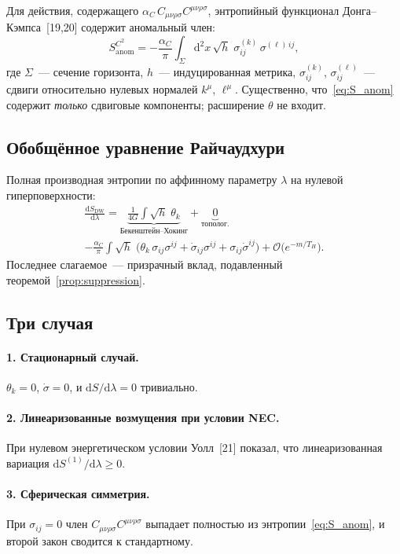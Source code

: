 \documentclass[12pt,a4paper]{article}
\newcommand{\dd}{\mathrm{d}}
\newcommand{\order}{\mathcal{O}}
\newcommand{\Thr}{T_{\!H}}
\newcommand{\Weylsq}{C_{\mu\nu\rho\sigma}C^{\mu\nu\rho\sigma}}
\theoremstyle{plain}
\theoremstyle{definition}
\begin{document}
Для действия, содержащего $\alpha_C\,\Weylsq$, энтропийный функционал
Донга--Кэмпса~[19,20] содержит аномальный член:
\begin{equation}\label{eq:S_anom}
  S_{\mathrm{anom}}^{C^2} = -\frac{\alpha_C}{\pi}
  \int_\Sigma\!\dd^2x\,\sqrt{h}\;
  \sigma^{(k)}_{ij}\,\sigma^{(\ell)\,ij},
\end{equation}
где $\Sigma$~--- сечение горизонта, $h$~--- индуцированная метрика,
$\sigma^{(k)}_{ij}$, $\sigma^{(\ell)}_{ij}$~--- сдвиги
относительно нулевых нормалей $k^\mu$, $\ell^\mu$. Существенно,
что~\eqref{eq:S_anom} содержит \emph{только} сдвиговые компоненты;
расширение $\theta$ не входит.

\subsection{Обобщённое уравнение Райчаудхури}

Полная производная энтропии по аффинному параметру $\lambda$
на нулевой гиперповерхности:
\begin{multline}\label{eq:dS_dlambda}
  \frac{\dd S_{\mathrm{DW}}}{\dd\lambda}
  = \underbrace{\frac{1}{4G}\int\!\sqrt{h}\;\theta_k}_{\text{Бекенштейн--Хокинг}}
  + \underbrace{0}_{\text{тополог.}}  \\
  - \frac{\alpha_C}{\pi}\int\!\sqrt{h}\;
  \bigl(\theta_k\,\sigma_{ij}\sigma^{ij}
  + \dot\sigma_{ij}\sigma^{ij}
  + \sigma_{ij}\dot\sigma^{ij}\bigr)
  + \order\!\bigl(e^{-m/\Thr}\bigr).
\end{multline}
Последнее слагаемое~--- призрачный вклад, подавленный
теоремой~\ref{prop:suppression}.

\subsection{Три случая}

\paragraph{1. Стационарный случай.}
$\theta_k = 0$, $\dot\sigma = 0$, и $\dd S/\dd\lambda = 0$
тривиально.

\paragraph{2. Линеаризованные возмущения при условии NEC.}
При нулевом энергетическом условии Уолл~[21] показал, что
линеаризованная вариация $\dd S^{(1)}/\dd\lambda \geq 0$.

\paragraph{3. Сферическая симметрия.}
При $\sigma_{ij} = 0$ член $\Weylsq$ выпадает полностью из
энтропии~\eqref{eq:S_anom}, и второй закон сводится к стандартному.
\end{document}
